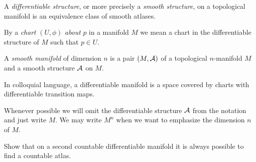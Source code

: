 \begin{defn}\label{def:diffstr}
  A \emph{differentiable structure}, or more precisely a \emph{smooth structure}, on a topological manifold is an equivalence class of smooth atlases.
\end{defn}

\begin{ntn}
By a \emph{chart $(U, \phi)$ about $p$} in a manifold $M$ we mean a chart in the differentiable structure of $M$ such that $p\in U$.
\end{ntn}

\begin{defn}\label{def:diffmanifold}
  A \emph{smooth manifold} of dimension $n$ is a pair $(M, \mathcal{A})$ of a topological $n$-manifold $M$ and a smooth structure $\mathcal{A}$ on $M$.
\end{defn}

In colloquial language, a differentiable manifold is a space covered by charts with differentiable transition maps.

Whenever possible we will omit the differentiable structure $\mathcal{A}$ from the notation and just write $M$.
We may write $M^n$ when we want to emphasize the dimension $n$ of $M$.

\begin{exe}
  Show that on a second countable differentiable manifold it is always possible to find a countable atlas.
\end{exe}

